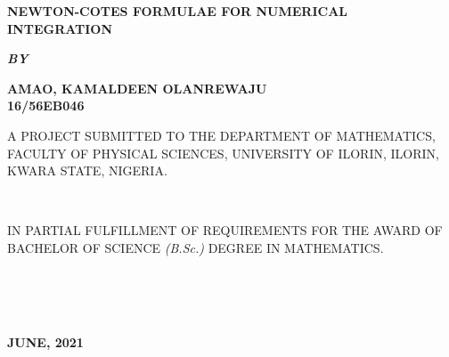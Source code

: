 \documentclass[12pt]{report}
\newcommand{\bt}[1]{\textbf{#1}}
\begin{document}
	
	\clearpage
	\thispagestyle{empty}
	\begin{center}
		\LARGE \bt{NEWTON-COTES FORMULAE FOR NUMERICAL INTEGRATION}
	\end{center}

	\hspace{7cm}
	
	\begin{center}
		\textbf{\textit{BY}}
	\end{center}
	
	\hspace{5cm}
	
	\begin{center}
		\Large \textbf{AMAO, KAMALDEEN OLANREWAJU 
			\\
			16/56EB046}
	\end{center}
	
	\hspace{9cm}
	
	\begin{center}
		A PROJECT SUBMITTED TO THE DEPARTMENT OF MATHEMATICS, FACULTY OF PHYSICAL SCIENCES, UNIVERSITY OF ILORIN, ILORIN, KWARA STATE, NIGERIA.
	\end{center}

	\hspace{8cm} \\
	
	\begin{center}
		IN PARTIAL FULFILLMENT OF REQUIREMENTS FOR THE AWARD OF BACHELOR OF SCIENCE \textit{(B.Sc.)} DEGREE IN MATHEMATICS.
	\end{center}
	\hspace{5cm}
	\\ \\ \\
	\begin{center}
		\textbf{JUNE, 2021}
	\end{center}

	\newpage
\end{document}
